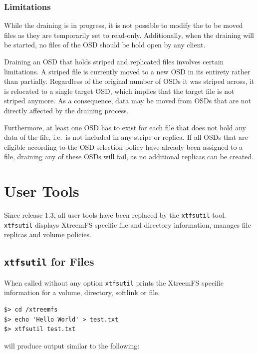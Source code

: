 \documentclass[a4paper,10pt]{book}
\begin{document}
\subsubsection{Limitations}

While the draining is in progress, it is not possible to modify the to be moved files as they are temporarily set to read-only. Additionally, when the draining will be started, no files of the OSD should be hold open by any client.

Draining an OSD that holds striped and replicated files involves certain limitations. A striped file is currently moved to a new OSD in its entirety rather than partially. Regardless of the original number of OSDs it was striped across, it is relocated to a single target OSD, which implies that the target file is not striped anymore. As a consequence, data may be moved from OSDs that are not directly affected by the draining process.

Furthermore, at least one OSD has to exist for each file that does not hold any data of the file, i.e.\ is not included in any stripe or replica. If all OSDs that are eligible according to the OSD selection policy have already been assigned to a file, draining any of these OSDs will fail, as no additional replicas can be created.

\section{User Tools}

Since release 1.3, all user tools have been replaced by the \texttt{xtfsutil} tool. \texttt{xtfsutil} displays XtreemFS specific file and directory information, manages file replicas and volume policies.

\subsection{\texttt{xtfsutil} for Files}
\label{sec:xtfsutil_files}

When called without any option \texttt{xtfsutil} prints the XtreemFS specific information for a volume, directory, softlink or file.

\begin{verbatim}
$> cd /xtreemfs
$> echo 'Hello World' > test.txt
$> xtfsutil test.txt
\end{verbatim}


will produce output similar to the following:
\end{document}
